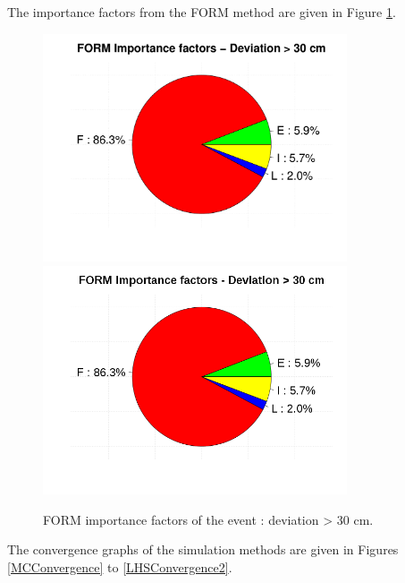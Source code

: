 \documentclass[11pt]{article}
\begin{document}
The importance factors from the FORM method are given in Figure \ref{FormIF}.

\begin{figure}[Hhbtp]
  \begin{center}
    \ifpdf
    \includegraphics[width=9cm]{ImportanceFactorsDrawingFORM.pdf}
    \else
    \includegraphics[width=9cm]{ImportanceFactorsDrawingFORM.png}
    \fi
  \end{center}
  \caption{FORM importance factors of the event : deviation > 30 cm.}
  \label{FormIF}
\end{figure}

The convergence graphs of the simulation methods are given in Figures \ref{MCConvergence} to \ref{LHSConvergence2}.
\end{document}

